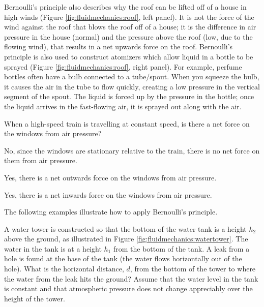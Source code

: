 {{Bernoulli's principle also describes why the roof can be lifted off of a house in high winds (Figure \ref{fig:fluidmechanics:roof}, left panel). It is not the force of the wind against the roof that blows the roof off of a house; it is the difference in air pressure in the house (normal) and the pressure above the roof (low, due to the flowing wind), that results in a net upwards force on the roof. Bernoulli's principle is also used to construct atomizers which allow liquid in a bottle to be sprayed (Figure \ref{fig:fluidmechanics:roof}, right panel). For example, perfume bottles often have a bulb connected to a tube/spout. When you squeeze the bulb, it causes the air in the tube to flow quickly, creating a low pressure in the vertical segment of the spout. The liquid is forced up by the pressure in the bottle; once the liquid arrives in the fast-flowing air, it is sprayed out along with the air.

\begin{checkpoint}
\begin{MCquestion}{When a high-speed train is travelling at constant speed, is there a net force on the windows from air pressure?}
\item No, since the windows are stationary relative to the train, there is no net force on them from air pressure.
\item Yes, there is a net outwards force on the windows from air pressure. \correct
\item Yes, there is a net inwards force on the windows from air pressure.
\end{MCquestion}
\end{checkpoint}
The following examples illustrate how to apply Bernoulli's principle.
\vspace{-0.25cm}
\begin{example}{ A water tower is constructed so that the bottom of the water tank is a height $h_2$ above the ground, as illustrated in Figure \ref{fig:fluidmechanics:watertower}. The water in the tank is at a height $h_1$ from the bottom of the tank. A leak from a hole is found at the base of the tank (the water flows horizontally out of the hole). What is the horizontal distance, $d$, from the bottom of the tower to where the water from the leak hits the ground? Assume that the water level in the tank is constant and that atmospheric pressure does not change appreciably over the height of the tower.}


\end{example}}}
